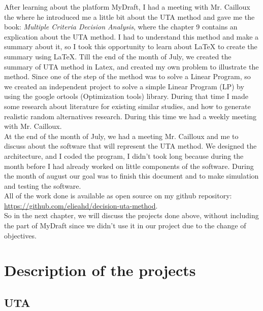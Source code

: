 \documentclass{report}
\begin{document}
After learning about the platform MyDraft, I had a meeting with Mr. Cailloux the  where he introduced me a little bit about the UTA method and gave me the book: \textit{Multiple Criteria Decision Analysis}, where the chapter 9 contains an explication about the UTA method. I had to understand this method and make a summary about it, so I took this opportunity to learn about LaTeX to create the summary using LaTeX. Till the end of the month of July, we created the summary of UTA method in Latex, and created my own problem to illustrate the method. Since one of the step of the method was to solve a Linear Program, so we created an independent project to solve a simple Linear Program (LP) by using  the google ortools (Optimization tools) library. During that time I made some research about literature for existing similar studies, and how to generate realistic random alternatives research. During this time we had a weekly meeting with Mr. Cailloux.\\

At the end of the month of July, we had a meeting Mr. Cailloux and me to discuss about the software that will represent the UTA method. We designed the architecture, and I coded the program, I didn't took long because during the month before I had already worked on little components of the software. During the month of august our goal was to finish this document and to make simulation and testing the software.\\  

All of the work done is available as open source on my github repository: \url{ https://github.com/elieahd/decision-uta-method}.\\

So in the next chapter, we will discuss the projects done above, without including the part of MyDraft since we didn't use it in our project due to the change of objectives. 

\chapter{Description of the projects}
\section{UTA}
\end{document}
